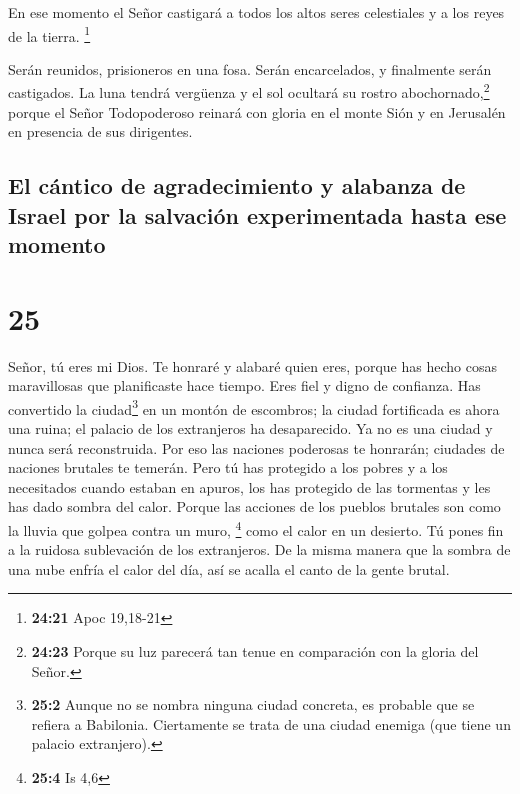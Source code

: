  En ese momento el Señor castigará a todos los altos
seres celestiales y a los reyes de la tierra. \footnote{\textbf{24:21}
  Apoc 19,18-21}

 Serán reunidos, prisioneros en una fosa. Serán
encarcelados, y finalmente serán castigados.  La luna
tendrá vergüenza y el sol ocultará su rostro abochornado,\footnote{\textbf{24:23}
  Porque su luz parecerá tan tenue en comparación con la gloria del
  Señor.} porque el Señor Todopoderoso reinará con gloria en el monte
Sión y en Jerusalén en presencia de sus dirigentes.

\hypertarget{el-cuxe1ntico-de-agradecimiento-y-alabanza-de-israel-por-la-salvaciuxf3n-experimentada-hasta-ese-momento}{%
\subsection{El cántico de agradecimiento y alabanza de Israel por la
salvación experimentada hasta ese
momento}\label{el-cuxe1ntico-de-agradecimiento-y-alabanza-de-israel-por-la-salvaciuxf3n-experimentada-hasta-ese-momento}}

\hypertarget{section-24}{%
\section{25}\label{section-24}}

 Señor, tú eres mi Dios. Te honraré y alabaré quien eres,
porque has hecho cosas maravillosas que planificaste hace tiempo. Eres
fiel y digno de confianza.  Has convertido la
ciudad\footnote{\textbf{25:2} Aunque no se nombra ninguna ciudad
  concreta, es probable que se refiera a Babilonia. Ciertamente se trata
  de una ciudad enemiga (que tiene un palacio extranjero).} en un montón
de escombros; la ciudad fortificada es ahora una ruina; el palacio de
los extranjeros ha desaparecido. Ya no es una ciudad y nunca será
reconstruida.  Por eso las naciones poderosas te honrarán;
ciudades de naciones brutales te temerán.  Pero tú has
protegido a los pobres y a los necesitados cuando estaban en apuros, los
has protegido de las tormentas y les has dado sombra del calor. Porque
las acciones de los pueblos brutales son como la lluvia que golpea
contra un muro, \footnote{\textbf{25:4} Is 4,6}  como el
calor en un desierto. Tú pones fin a la ruidosa sublevación de los
extranjeros. De la misma manera que la sombra de una nube enfría el
calor del día, así se acalla el canto de la gente brutal.

